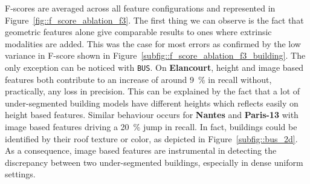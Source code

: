         \begin{figure}[htpb]
            \centering
        \end{figure}

        F-scores are averaged across all feature configurations and represented in Figure~\ref{fig::f_score_ablation_f3}.
        The first thing we can observe is the fact that geometric features alone give comparable results to ones where extrinsic modalities are added.
        This was the case for most errors as confirmed by the low variance in F-score shown in Figure~\ref{subfig::f_score_ablation_f3_building}.
        The only exception can be noticed with \texttt{BUS}.
        On \textbf{Elancourt}, height and image based features both contribute to an increase of around \SI{9}{\percent} in recall without, practically, any loss in precision.
        This can be explained by the fact that a lot of under-segmented building models have different heights which reflects easily on height based features.
        Similar behaviour occurs for \textbf{Nantes} and \textbf{Paris-13} with image based features driving a \SI{20}{\percent} jump in recall.
        In fact, buildings could be identified by their roof texture or color, as depicted in Figure~\ref{subfig::bus_2d}.
        As a consequence, image based features are instrumental in detecting the discrepancy between two under-segmented buildings, especially in dense uniform settings.

